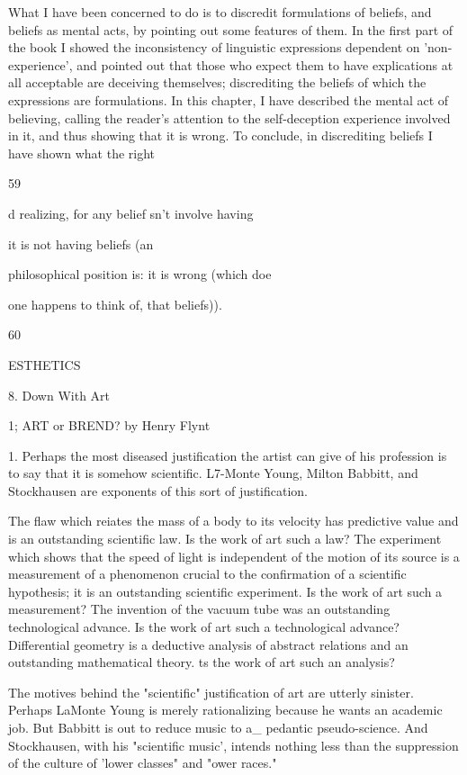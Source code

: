 \documentclass[10pt,twoside]{memoir}
\begin{document}
\begin{enumerate}
{{{{{{{{{{{{{{What I have been concerned to do is to discredit formulations of 
beliefs, and beliefs as mental acts, by pointing out some features of them. In 
the first part of the book I showed the inconsistency of linguistic expressions 
dependent on 'non-experience', and pointed out that those who expect them 
to have explications at all acceptable are deceiving themselves; discrediting 
the beliefs of which the expressions are formulations. In this chapter, I have 
described the mental act of believing, calling the reader's attention to the 
self-deception experience involved in it, and thus showing that it is wrong. 
To conclude, in discrediting beliefs I have shown what the right 


59 


d realizing, for any belief 
sn't involve having 


it is not having beliefs (an 


philosophical position is: 
it is wrong (which doe 


one happens to think of, that 
beliefs)). 


60 


ESTHETICS 


8. Down With Art 


1; 
ART or BREND? by Henry Flynt 


1. Perhaps the most diseased justification the artist can give of his profession 
is to say that it is somehow scientific. L7-Monte Young, Milton Babbitt, and 
Stockhausen are exponents of this sort of justification. 

The flaw which reiates the mass of a body to its velocity has predictive value 
and is an outstanding scientific law. Is the work of art such a law? The 
experiment which shows that the speed of light is independent of the motion 
of its source is a measurement of a phenomenon crucial to the confirmation of 
a scientific hypothesis; it is an outstanding scientific experiment. Is the work 
of art such a measurement? The invention of the vacuum tube was an 
outstanding technological advance. Is the work of art such a technological 
advance? Differential geometry is a deductive analysis of abstract relations 
and an outstanding mathematical theory. ts the work of art such an 
analysis? 

The motives behind the "scientific" justification of art are utterly sinister. 
Perhaps LaMonte Young is merely rationalizing because he wants an 
academic job. But Babbitt is out to reduce music to a_ pedantic 
pseudo-science. And Stockhausen, with his "scientific music', intends 
nothing less than the suppression of the culture of 'lower classes" and 
"ower races." 

}}}}}}}}}}}}}}
\end{enumerate}
\end{document}
